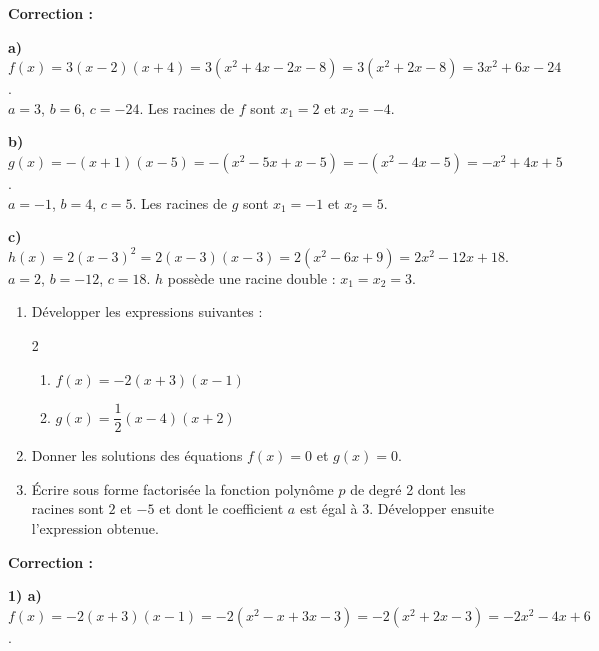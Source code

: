 \documentclass[11pt,a4paper]{book}
\begin{document}
\medskip
\noindent\textbf{\color{red!75!black}Correction :}

\smallskip
\begin{corrBox}
	\textbf{a)} $f(x)=3(x-2)(x+4)=3\left(x^2+4x-2x-8\right)=3\left(x^2+2x-8\right)=3x^2+6x-24$.\\
	$a=3$, $b=6$, $c=-24$. Les racines de $f$ sont $x_1=2$ et $x_2=-4$.
\end{corrBox}

\medskip
\begin{corrBox}
	\textbf{b)} $g(x)=-(x+1)(x-5)=-\left(x^2-5x+x-5\right)=-\left(x^2-4x-5\right)=-x^2+4x+5$.\\
	$a=-1$, $b=4$, $c=5$. Les racines de $g$ sont $x_1=-1$ et $x_2=5$.
\end{corrBox}

\medskip
\begin{corrBox}
	\textbf{c)} $h(x)=2(x-3)^2=2(x-3)(x-3)=2\left(x^2-6x+9\right)=2x^2-12x+18$.\\
	$a=2$, $b=-12$, $c=18$. $h$ possède une racine double : $x_1=x_2=3$.
\end{corrBox}

\exerciceDS{}

\begin{enumerate}[label=\textbf{\arabic*)}]
	\item Développer les expressions suivantes :
	\begin{multicols}{2}
		\begin{enumerate}[label=\textbf{\alph*)}]
			\item $f(x)=-2(x+3)(x-1)$
			\item $g(x)=\dfrac{1}{2}(x-4)(x+2)$
		\end{enumerate}
	\end{multicols}
	\item Donner les solutions des équations $f(x)=0$ et $g(x)=0$.
	\item Écrire sous forme factorisée la fonction polynôme $p$ de degré 2 dont les racines sont $2$ et $-5$ et dont le coefficient $a$ est égal à $3$. Développer ensuite l'expression obtenue.
\end{enumerate}

\medskip
\noindent\textbf{\color{red!75!black}Correction :}

\smallskip
\begin{corrBox}
	\textbf{1) a)} $f(x)=-2(x+3)(x-1)=-2\left(x^2-x+3x-3\right)=-2\left(x^2+2x-3\right)=-2x^2-4x+6$.
\end{corrBox}
\end{document}
